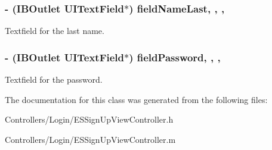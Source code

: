 \subsubsection[{field\+Name\+Last}]{\setlength{\rightskip}{0pt plus 5cm}-\/ (I\+B\+Outlet U\+I\+Text\+Field$\ast$) field\+Name\+Last\hspace{0.3cm}{\ttfamily [read]}, {\ttfamily [write]}, {\ttfamily [nonatomic]}, {\ttfamily [strong]}}\label{interface_e_s_sign_up_view_controller_ab18ed392ce76c100d25681bc39d7375c}
Textfield for the last name. \hypertarget{interface_e_s_sign_up_view_controller_a4cfa3aa732529c3c51c762238ad7a139}{}
\subsubsection[{field\+Password}]{\setlength{\rightskip}{0pt plus 5cm}-\/ (I\+B\+Outlet U\+I\+Text\+Field$\ast$) field\+Password\hspace{0.3cm}{\ttfamily [read]}, {\ttfamily [write]}, {\ttfamily [nonatomic]}, {\ttfamily [strong]}}\label{interface_e_s_sign_up_view_controller_a4cfa3aa732529c3c51c762238ad7a139}
Textfield for the password. 

The documentation for this class was generated from the following files\+:\begin{DoxyCompactItemize}
\item 
Controllers/\+Login/E\+S\+Sign\+Up\+View\+Controller.\+h\item 
Controllers/\+Login/E\+S\+Sign\+Up\+View\+Controller.\+m\end{DoxyCompactItemize}
